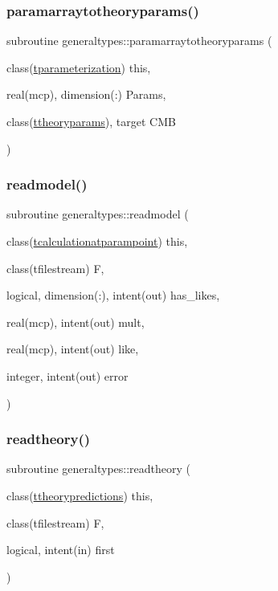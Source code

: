 \subsubsection{\texorpdfstring{paramarraytotheoryparams()}{paramarraytotheoryparams()}}
{\footnotesize\ttfamily subroutine generaltypes\+::paramarraytotheoryparams (\begin{DoxyParamCaption}\item[{class(\mbox{\hyperlink{structgeneraltypes_1_1tparameterization}{tparameterization}})}]{this,  }\item[{real(mcp), dimension(\+:)}]{Params,  }\item[{class(\mbox{\hyperlink{structgeneraltypes_1_1ttheoryparams}{ttheoryparams}}), target}]{C\+MB }\end{DoxyParamCaption})\hspace{0.3cm}{\ttfamily [private]}}

\mbox{\label{namespacegeneraltypes_a9fdd457b58418041f9a4639dd76570db}} 
\subsubsection{\texorpdfstring{readmodel()}{readmodel()}}
{\footnotesize\ttfamily subroutine generaltypes\+::readmodel (\begin{DoxyParamCaption}\item[{class(\mbox{\hyperlink{structgeneraltypes_1_1tcalculationatparampoint}{tcalculationatparampoint}})}]{this,  }\item[{class(tfilestream)}]{F,  }\item[{logical, dimension(\+:), intent(out)}]{has\+\_\+likes,  }\item[{real(mcp), intent(out)}]{mult,  }\item[{real(mcp), intent(out)}]{like,  }\item[{integer, intent(out)}]{error }\end{DoxyParamCaption})\hspace{0.3cm}{\ttfamily [private]}}

\mbox{\label{namespacegeneraltypes_aaa999beeb15e5412eba1146d1250b25f}} 
\subsubsection{\texorpdfstring{readtheory()}{readtheory()}}
{\footnotesize\ttfamily subroutine generaltypes\+::readtheory (\begin{DoxyParamCaption}\item[{class(\mbox{\hyperlink{structgeneraltypes_1_1ttheorypredictions}{ttheorypredictions}})}]{this,  }\item[{class(tfilestream)}]{F,  }\item[{logical, intent(in)}]{first }\end{DoxyParamCaption})\hspace{0.3cm}{\ttfamily [private]}}

